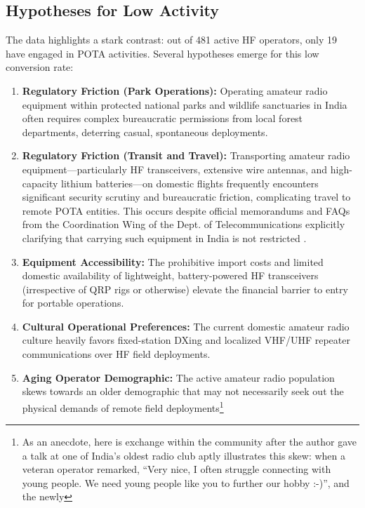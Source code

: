 \documentclass[conference]{IEEEtran}
\begin{document}
\subsection{Hypotheses for Low Activity}
\label{subsection:hypotheses}
The data highlights a stark contrast: out of 481 active HF operators,
only 19 have engaged in POTA activities. Several hypotheses emerge for
this low conversion rate:
\begin{enumerate}
    \item \textbf{Regulatory Friction (Park Operations):} Operating
      amateur radio equipment within protected national parks and
      wildlife sanctuaries in India often requires complex
      bureaucratic permissions from local forest departments,
      deterring casual, spontaneous deployments.
    \item \textbf{Regulatory Friction (Transit and Travel):}
      Transporting amateur radio equipment—particularly HF
      transceivers, extensive wire antennas, and high-capacity lithium
      batteries—on domestic flights frequently encounters significant
      security scrutiny and bureaucratic friction, complicating travel
      to remote POTA entities. This occurs despite official
      memorandums and FAQs from the Coordination Wing of the Dept. of
      Telecommunications explicitly clarifying that carrying such
      equipment in India is not restricted \cite{b14, b15}.
    \item \textbf{Equipment Accessibility:} The prohibitive import
      costs and limited domestic availability of lightweight,
      battery-powered HF transceivers (irrespective of QRP rigs or
      otherwise) elevate the financial barrier to entry for portable
      operations.
    \item \textbf{Cultural Operational Preferences:} The current
      domestic amateur radio culture heavily favors fixed-station
      DXing and localized VHF/UHF repeater communications over HF
      field deployments.
    \item \textbf{Aging Operator Demographic:} The active amateur
      radio population skews towards an older demographic that may not
      necessarily seek out the physical demands of remote field
      deployments\footnote{As an anecdote, here is exchange within the community after
      the author gave a talk at one of India's oldest radio club aptly
      illustrates this skew: when a veteran operator remarked, ``Very
      nice, I often struggle connecting with young people. We need
      young people like you to further our hobby :-)'', and the newly
}
\end{enumerate}
\end{document}
